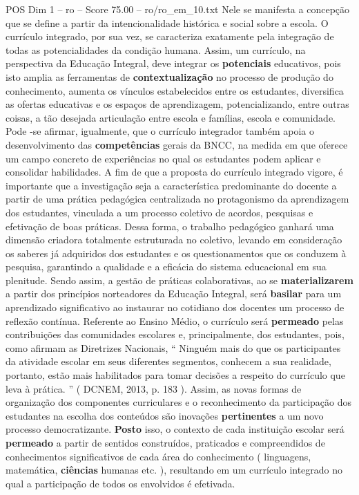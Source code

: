 \begin{textsample}{POS Dim 1 – ro – Score 75.00 – ro/ro\_em\_10.txt}
Nele se manifesta a concepção que se define a partir da intencionalidade histórica e social sobre a escola.
O currículo integrado, por sua vez, se caracteriza exatamente pela integração de todas as potencialidades da condição humana.
Assim, um currículo, na perspectiva da Educação Integral, deve integrar os \textbf{potenciais} educativos, pois isto amplia as ferramentas de \textbf{contextualização} no processo de produção do conhecimento, aumenta os vínculos estabelecidos entre os estudantes, diversifica as ofertas educativas e os espaços de aprendizagem, potencializando, entre outras coisas, a tão desejada articulação entre escola e famílias, escola e comunidade.
Pode -se afirmar, igualmente, que o currículo integrador também apoia o desenvolvimento das \textbf{competências} gerais da BNCC, na medida em que oferece um campo concreto de experiências no qual os estudantes podem aplicar e consolidar habilidades.
A fim de que a proposta do currículo integrado vigore, é importante que a investigação seja a característica predominante do docente a partir de uma prática pedagógica centralizada no protagonismo da aprendizagem dos estudantes, vinculada a um processo coletivo de acordos, pesquisas e efetivação de boas práticas.
Dessa forma, o trabalho pedagógico ganhará uma dimensão criadora totalmente estruturada no coletivo, levando em consideração os saberes já adquiridos dos estudantes e os questionamentos que os conduzem à pesquisa, garantindo a qualidade e a eficácia do sistema educacional em sua plenitude.
Sendo assim, a gestão de práticas colaborativas, ao se \textbf{materializarem} a partir dos princípios norteadores da Educação Integral, será \textbf{basilar} para um aprendizado significativo ao instaurar no cotidiano dos docentes um processo de reflexão contínua.
Referente ao Ensino Médio, o currículo será \textbf{permeado} pelas contribuições das comunidades escolares e, principalmente, dos estudantes, pois, como afirmam as Diretrizes Nacionais, “ Ninguém mais do que os participantes da atividade escolar em seus diferentes segmentos, conhecem a sua realidade, portanto, estão mais habilitados para tomar decisões a respeito do currículo que leva à prática. ” ( DCNEM, 2013, p. 183 ).
Assim, as novas formas de organização dos componentes curriculares e o reconhecimento da participação dos estudantes na escolha dos conteúdos são inovações \textbf{pertinentes} a um novo processo democratizante. \textbf{Posto} isso, o contexto de cada instituição escolar será \textbf{permeado} a partir de sentidos construídos, praticados e compreendidos de conhecimentos significativos de cada área do conhecimento ( linguagens, matemática, \textbf{ciências} humanas etc. ), resultando em um currículo integrado no qual a participação de todos os envolvidos é efetivada.

\end{textsample}
